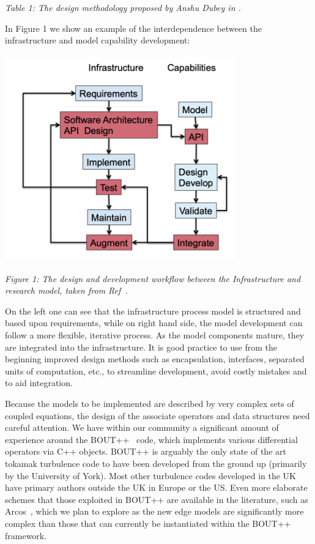 \documentclass{article}
\begin{document}
\begin{center}
\textit{Table 1: The design methodology proposed by Anshu Dubey in \cite{ref:8}.}
\end{center}

\baselineskip=18pt
In Figure 1 we show an example of the interdependence between the infrastructure 
and model capability development:

\begin{center}
\includegraphics[width=281pt, height=253pt, keepaspectratio=true]{../png/wkflow.png}

\label{HRef34587331}
\end{center}

\baselineskip=18pt
{ \textit{Figure 1: The design and development workflow between 
the Infrastructure and research model, taken from Ref~\cite{ref:8}.}}

On the left one can see that the infrastructure process model is structured and 
based upon requirements, while on right hand side, the model development can follow 
a more flexible, iterative process. As the model components mature, they are integrated 
into the infrastructure. It is good practice to use from the beginning improved 
design methods such as encapsulation, interfaces, separated units of computation, 
etc., to streamline development, avoid costly mistakes and to aid integration.

Because the models to be implemented are described by very complex sets of coupled 
equations, the design of the associate operators and data structures need careful 
attention. We have within our community a significant amount of experience around 
the BOUT++~\cite{ref:9} code, which implements various differential operators via C++ objects. 
BOUT++ is arguably the only state of the art tokamak turbulence code to have been 
developed from the ground up (primarily by the University of York). Most other turbulence 
codes developed in the UK have primary authors outside the UK in Europe or the 
US. Even more elaborate schemes that those exploited in BOUT++ are available in 
the literature, such as Arcos~\cite{ref:10}, which we plan to explore as the new edge models 
are significantly more complex than those that can currently be instantiated within 
the BOUT++ framework.
\end{document}

